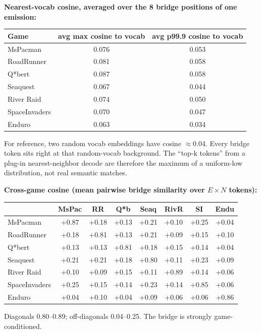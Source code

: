 \documentclass[11pt]{article}
\begin{document}
\smallskip\noindent\textbf{Nearest-vocab cosine, averaged over the 8 bridge positions of one emission:}

\smallskip\noindent
\begin{tabular}{lcc}
\toprule
Game & avg max cosine to vocab & avg p99.9 cosine to vocab \\
\midrule
MsPacman      & 0.076 & 0.053 \\
RoadRunner    & 0.081 & 0.058 \\
Q*bert        & 0.087 & 0.058 \\
Seaquest      & 0.067 & 0.044 \\
River Raid    & 0.074 & 0.050 \\
SpaceInvaders & 0.070 & 0.047 \\
Enduro        & 0.063 & 0.034 \\
\bottomrule
\end{tabular}\smallskip

For reference, two random vocab embeddings have cosine $\approx$0.04. Every bridge token sits right at that random-vocab background. The ``top-k tokens'' from a plug-in nearest-neighbor decode are therefore the maximum of a uniform-low distribution, not real semantic matches.

\smallskip\noindent\textbf{Cross-game cosine (mean pairwise bridge similarity over $E\!\times\!N$ tokens):}

\smallskip\noindent
\begin{tabular}{lccccccc}
\toprule
              & MsPac & RR & Q*b & Seaq & RivR & SI & Endu \\
\midrule
MsPacman      & +0.87 & +0.18 & +0.13 & +0.21 & +0.10 & +0.25 & +0.04 \\
RoadRunner    & +0.18 & +0.81 & +0.13 & +0.21 & +0.09 & +0.15 & +0.10 \\
Q*bert        & +0.13 & +0.13 & +0.81 & +0.18 & +0.15 & +0.14 & +0.04 \\
Seaquest      & +0.21 & +0.21 & +0.18 & +0.80 & +0.11 & +0.23 & +0.09 \\
River Raid    & +0.10 & +0.09 & +0.15 & +0.11 & +0.89 & +0.14 & +0.06 \\
SpaceInvaders & +0.25 & +0.15 & +0.14 & +0.23 & +0.14 & +0.85 & +0.06 \\
Enduro        & +0.04 & +0.10 & +0.04 & +0.09 & +0.06 & +0.06 & +0.86 \\
\bottomrule
\end{tabular}\smallskip

Diagonals 0.80--0.89; off-diagonals 0.04--0.25. The bridge is strongly game-conditioned.
\end{document}
